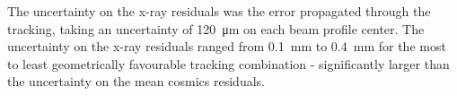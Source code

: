 The uncertainty on the x-ray residuals was the error propagated through the tracking, taking an uncertainty of \SI{120}{\micro\meter} on each beam profile center. The uncertainty on the x-ray residuals ranged from \SI{0.1}{mm} to \SI{0.4}{mm} for the most to least geometrically favourable tracking combination - significantly larger than the uncertainty on the mean cosmics residuals. 
